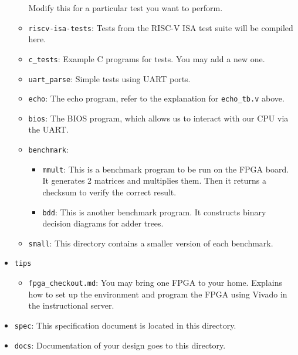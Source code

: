 \begin{itemize}
\begin{itemize}
    Modify this for a particular test you want to perform.
  \item \verb|riscv-isa-tests|:
    Tests from the RISC-V ISA test suite will be compiled here.
  \item \verb|c_tests|:
    Example C programs for tests.
    You may add a new one.
  \item \verb|uart_parse|:
    Simple tests using UART ports.
  \item \verb|echo|:
    The echo program, refer to the explanation for \verb|echo_tb.v| above.
  \item \verb|bios|:
    The BIOS program, which allows us to interact with our CPU via the UART.
  \item \verb|benchmark|:
    \begin{itemize}
    \item \verb|mmult|:
      This is a benchmark program to be run on the FPGA board.
      It generates 2 matrices and multiplies them.
      Then it returns a checksum to verify the correct result.
    \item \verb|bdd|:
      This is another benchmark program.
      It constructs binary decision diagrams for adder trees.
    \end{itemize}
  \item \verb|small|:
    This directory contains a smaller version of each benchmark.
  \end{itemize}
\item \verb|tips|
  \begin{itemize}
  \item \verb|fpga_checkout.md|:
    You may bring one FPGA to your home.
    Explains how to set up the environment and program the FPGA using Vivado in the instructional server.
  \end{itemize}
\item \verb|spec|:
  This specification document is located in this directory.
\item \verb|docs|:
  Documentation of your design goes to this directory.
\end{itemize}

\newpage
